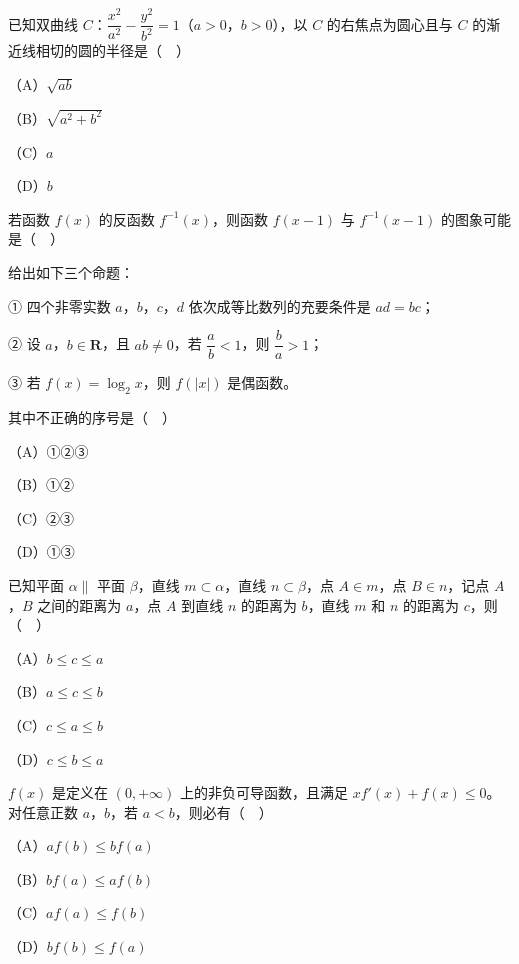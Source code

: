 \begin{question}
已知双曲线 $C$：$\dfrac{x^2}{a^2}-\dfrac{y^2}{b^2}=1$（$a>0$，$b>0$），以 $C$ 的右焦点为圆心且与 $C$ 的渐近线相切的圆的半径是（　）

（A）$\sqrt{ab}$

（B）$\sqrt{a^2+b^2}$

（C）$a$

（D）$b$

\Needspace{0.4\textheight}
\end{question}
\begin{question}
若函数 $f(x)$ 的反函数 $f^{-1}(x)$，则函数 $f(x-1)$ 与 $f^{-1}(x-1)$ 的图象可能是（　）
\nopagebreak[4]
\begin{center}\end{center}
\nopagebreak[4]
\end{question}
\begin{question}
给出如下三个命题：

① 四个非零实数 $a$，$b$，$c$，$d$ 依次成等比数列的充要条件是 $ad=bc$；

② 设 $a$，$b\in\mathbf R$，且 $ab\neq0$，若 $\dfrac ab<1$，则 $\dfrac ba>1$；

③ 若 $f(x)=\log_2x$，则 $f(|x|)$ 是偶函数。

其中不正确的序号是（　）

（A）①②③

（B）①②

（C）②③

（D）①③

\end{question}
\begin{question}
已知平面 $\alpha\parallel$ 平面 $\beta$，直线 $m\subset\alpha$，直线 $n\subset\beta$，点 $A\in m$，点 $B\in n$，记点 $A$，$B$ 之间的距离为 $a$，点 $A$ 到直线 $n$ 的距离为 $b$，直线 $m$ 和 $n$ 的距离为 $c$，则（　）

（A）$b\leqslant c\leqslant a$

（B）$a\leqslant c\leqslant b$

（C）$c\leqslant a\leqslant b$

（D）$c\leqslant b\leqslant a$

\end{question}
\begin{question}
$f(x)$ 是定义在 $(0,+\infty)$ 上的非负可导函数，且满足 $xf'(x)+f(x)\leqslant0$。对任意正数 $a$，$b$，若 $a<b$，则必有（　）

（A）$af(b)\leqslant bf(a)$

（B）$bf(a)\leqslant af(b)$

（C）$af(a)\leqslant f(b)$

（D）$bf(b)\leqslant f(a)$

\end{question}
